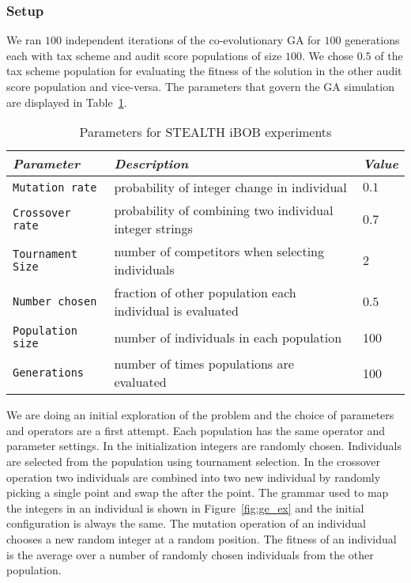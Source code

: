\subsubsection{Setup}

We ran $100$ independent iterations of the co-evolutionary GA for $100$
generations each with tax scheme and audit score populations of size
$100$. We chose $0.5$ of the tax scheme population for evaluating the
fitness of the solution in the other audit score population and
vice-versa. The parameters that govern the GA simulation are displayed in
Table~\ref{tab:SCOTE_parameters}.

\begin{table}[!htb]
  \small
  \centering
  \caption{Parameters for STEALTH iBOB experiments}
  \label{tab:SCOTE_parameters} 
  \begin{tabular}{l|p{8cm}|l}
    \textit{Parameter} & \textit{Description} & \textit{Value} \\ \hline
    \texttt{Mutation rate}     & probability of integer change in individual  &  $0.1$ \\ \hline
    \texttt{Crossover rate}    & probability of combining two individual integer strings  &  $0.7$ \\ \hline
    \texttt{Tournament Size} & number of competitors when selecting individuals  &  $ 2 $ \\ \hline
    \texttt{Number chosen}   & fraction of other population each individual is evaluated  &  $ 0.5$ \\ \hline
    \texttt{Population size}  & number of individuals in each population &  100   \\ \hline
    \texttt{Generations}     & number of times populations are evaluated  &  100    \\ 
  \end{tabular}
\end{table}

We are doing an initial exploration of the problem and the choice of
parameters and operators are a first attempt. Each population has the
same operator and parameter settings. In the initialization integers
are randomly chosen. Individuals are selected from the population
using tournament selection. In the crossover operation two individuals
are combined into two new individual by randomly picking a single
point and swap the after the point. The grammar used to map the
integers in an individual is shown in Figure~\ref{fig:ge_ex} and the
initial configuration is always the same. The mutation operation of an
individual chooses a new random integer at a random position. The
fitness of an individual is the average over a number of randomly
chosen individuals from the other population.

